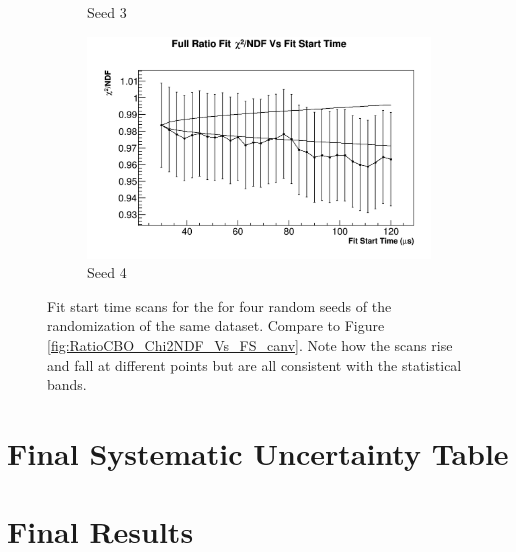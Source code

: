 \begin{figure}[]
\begin{subfigure}[t]{0.45\textwidth}
			    \caption{Seed 3}
		    \end{subfigure}
		    \begin{subfigure}[t]{0.45\textwidth}
			    \centering
				\includegraphics[width=\textwidth]{RatioCBO_Chi2NDF_Vs_FS_canv-Seed18}
			    \caption{Seed 4}
		    \end{subfigure}%
		\caption[RandomSeedFitStartScans]{Fit start time scans for the \chisq for four random seeds of the randomization of the same dataset. Compare to Figure \ref{fig:RatioCBO_Chi2NDF_Vs_FS_canv}. Note how the scans rise and fall at different points but are all consistent with the statistical bands.}
		\label{fig:RandomSeedFitStartScans}
		\end{figure}



\section{Final Systematic Uncertainty Table}

\section{Final Results}
